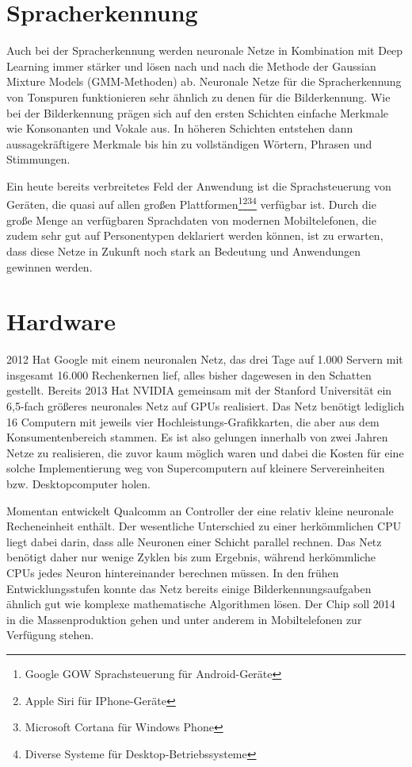 {\section{Spracherkennung}

Auch bei der Spracherkennung werden neuronale Netze in Kombination mit Deep Learning immer stärker und lösen nach und nach die Methode der Gaussian Mixture Models (GMM-Methoden) ab. Neuronale Netze für die Spracherkennung von Tonspuren funktionieren sehr ähnlich zu denen für die Bilderkennung. Wie bei der Bilderkennung prägen sich auf den ersten Schichten einfache Merkmale wie Konsonanten und Vokale aus. In höheren Schichten entstehen dann aussagekräftigere Merkmale bis hin zu vollständigen Wörtern, Phrasen und Stimmungen. 

Ein heute bereits verbreitetes Feld der Anwendung ist die Sprachsteuerung von Geräten, die quasi auf allen großen Plattformen\footnote{Google GOW Sprachsteuerung für Android-Geräte}\footnote{Apple Siri für IPhone-Geräte}\footnote{Microsoft Cortana für Windows Phone}\footnote{Diverse Systeme für Desktop-Betriebssysteme} verfügbar ist. Durch die große Menge an verfügbaren Sprachdaten von modernen Mobiltelefonen, die zudem sehr gut auf Personentypen deklariert werden können, ist zu erwarten, dass diese Netze in Zukunft noch stark an Bedeutung und Anwendungen gewinnen werden.

\section{Hardware}

2012 Hat Google mit einem neuronalen Netz, das drei Tage auf 1.000 Servern mit insgesamt 16.000 Rechenkernen lief, alles bisher dagewesen in den Schatten gestellt. Bereits 2013 Hat NVIDIA gemeinsam mit der Stanford Universität ein 6,5-fach größeres neuronales Netz auf GPUs realisiert. Das Netz benötigt lediglich 16 Computern mit jeweils vier Hochleistungs-Grafikkarten, die aber aus dem Konsumentenbereich stammen. Es ist also gelungen innerhalb von zwei Jahren Netze zu realisieren, die zuvor kaum möglich waren und dabei die Kosten für eine solche Implementierung weg von Supercomputern auf kleinere Servereinheiten bzw. Desktopcomputer holen.

Momentan entwickelt Qualcomm an Controller der eine relativ kleine neuronale Recheneinheit enthält. Der wesentliche Unterschied zu einer herkömmlichen CPU liegt dabei darin, dass alle Neuronen einer Schicht parallel rechnen. Das Netz benötigt daher nur wenige Zyklen bis zum Ergebnis, während herkömmliche CPUs jedes Neuron hintereinander berechnen müssen. In den frühen Entwicklungsstufen konnte das Netz bereits einige Bilderkennungsaufgaben ähnlich gut wie komplexe mathematische Algorithmen lösen. Der Chip soll 2014 in die Massenproduktion gehen und unter anderem in Mobiltelefonen zur Verfügung stehen.

}
